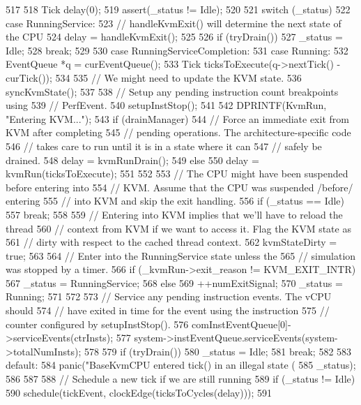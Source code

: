 \begin{DoxyCode}
517 {
518     Tick delay(0);
519     assert(_status != Idle);
520 
521     switch (_status) {
522       case RunningService:
523         // handleKvmExit() will determine the next state of the CPU
524         delay = handleKvmExit();
525 
526         if (tryDrain())
527             _status = Idle;
528         break;
529 
530       case RunningServiceCompletion:
531       case Running: {
532           EventQueue *q = curEventQueue();
533           Tick ticksToExecute(q->nextTick() - curTick());
534 
535           // We might need to update the KVM state.
536           syncKvmState();
537 
538           // Setup any pending instruction count breakpoints using
539           // PerfEvent.
540           setupInstStop();
541 
542           DPRINTF(KvmRun, "Entering KVM...\n");
543           if (drainManager) {
544               // Force an immediate exit from KVM after completing
545               // pending operations. The architecture-specific code
546               // takes care to run until it is in a state where it can
547               // safely be drained.
548               delay = kvmRunDrain();
549           } else {
550               delay = kvmRun(ticksToExecute);
551           }
552 
553           // The CPU might have been suspended before entering into
554           // KVM. Assume that the CPU was suspended /before/ entering
555           // into KVM and skip the exit handling.
556           if (_status == Idle)
557               break;
558 
559           // Entering into KVM implies that we'll have to reload the thread
560           // context from KVM if we want to access it. Flag the KVM state as
561           // dirty with respect to the cached thread context.
562           kvmStateDirty = true;
563 
564           // Enter into the RunningService state unless the
565           // simulation was stopped by a timer.
566           if (_kvmRun->exit_reason !=  KVM_EXIT_INTR) {
567               _status = RunningService;
568           } else {
569               ++numExitSignal;
570               _status = Running;
571           }
572 
573           // Service any pending instruction events. The vCPU should
574           // have exited in time for the event using the instruction
575           // counter configured by setupInstStop().
576           comInstEventQueue[0]->serviceEvents(ctrInsts);
577           system->instEventQueue.serviceEvents(system->totalNumInsts);
578 
579           if (tryDrain())
580               _status = Idle;
581       } break;
582 
583       default:
584         panic("BaseKvmCPU entered tick() in an illegal state (%
585               _status);
586     }
587 
588     // Schedule a new tick if we are still running
589     if (_status != Idle)
590         schedule(tickEvent, clockEdge(ticksToCycles(delay)));
591 }
\end{DoxyCode}
